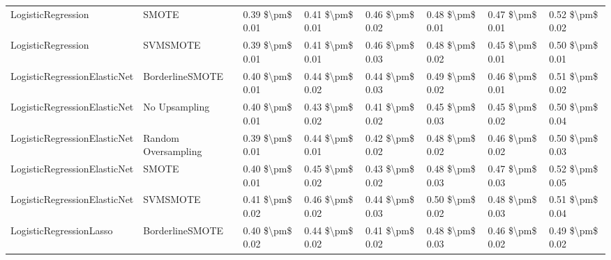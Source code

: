 \begin{tabular}{llllllll}
             LogisticRegression &                         SMOTE & 0.39 \$\textbackslash pm\$ 0.01 &           0.41 \$\textbackslash pm\$ 0.01 &       0.46 \$\textbackslash pm\$ 0.02 &        0.48 \$\textbackslash pm\$ 0.01 &                         0.47 \$\textbackslash pm\$ 0.01 &     0.52 \$\textbackslash pm\$ 0.02 \\
             LogisticRegression &                      SVMSMOTE & 0.39 \$\textbackslash pm\$ 0.01 &           0.41 \$\textbackslash pm\$ 0.01 &       0.46 \$\textbackslash pm\$ 0.03 &        0.48 \$\textbackslash pm\$ 0.02 &                         0.45 \$\textbackslash pm\$ 0.01 &     0.50 \$\textbackslash pm\$ 0.01 \\
   LogisticRegressionElasticNet &               BorderlineSMOTE & 0.40 \$\textbackslash pm\$ 0.01 &           0.44 \$\textbackslash pm\$ 0.02 &       0.44 \$\textbackslash pm\$ 0.03 &        0.49 \$\textbackslash pm\$ 0.02 &                         0.46 \$\textbackslash pm\$ 0.01 &     0.51 \$\textbackslash pm\$ 0.02 \\
   LogisticRegressionElasticNet &                 No Upsampling & 0.40 \$\textbackslash pm\$ 0.01 &           0.43 \$\textbackslash pm\$ 0.02 &       0.41 \$\textbackslash pm\$ 0.02 &        0.45 \$\textbackslash pm\$ 0.03 &                         0.45 \$\textbackslash pm\$ 0.02 &     0.50 \$\textbackslash pm\$ 0.04 \\
   LogisticRegressionElasticNet &           Random Oversampling & 0.39 \$\textbackslash pm\$ 0.01 &           0.44 \$\textbackslash pm\$ 0.01 &       0.42 \$\textbackslash pm\$ 0.02 &        0.48 \$\textbackslash pm\$ 0.02 &                         0.46 \$\textbackslash pm\$ 0.02 &     0.50 \$\textbackslash pm\$ 0.03 \\
   LogisticRegressionElasticNet &                         SMOTE & 0.40 \$\textbackslash pm\$ 0.01 &           0.45 \$\textbackslash pm\$ 0.02 &       0.43 \$\textbackslash pm\$ 0.02 &        0.48 \$\textbackslash pm\$ 0.03 &                         0.47 \$\textbackslash pm\$ 0.03 &     0.52 \$\textbackslash pm\$ 0.05 \\
   LogisticRegressionElasticNet &                      SVMSMOTE & 0.41 \$\textbackslash pm\$ 0.02 &           0.46 \$\textbackslash pm\$ 0.02 &       0.44 \$\textbackslash pm\$ 0.03 &        0.50 \$\textbackslash pm\$ 0.02 &                         0.48 \$\textbackslash pm\$ 0.03 &     0.51 \$\textbackslash pm\$ 0.04 \\
        LogisticRegressionLasso &               BorderlineSMOTE & 0.40 \$\textbackslash pm\$ 0.02 &           0.44 \$\textbackslash pm\$ 0.02 &       0.41 \$\textbackslash pm\$ 0.02 &        0.48 \$\textbackslash pm\$ 0.03 &                         0.46 \$\textbackslash pm\$ 0.02 &     0.49 \$\textbackslash pm\$ 0.02 \\

\end{tabular}
